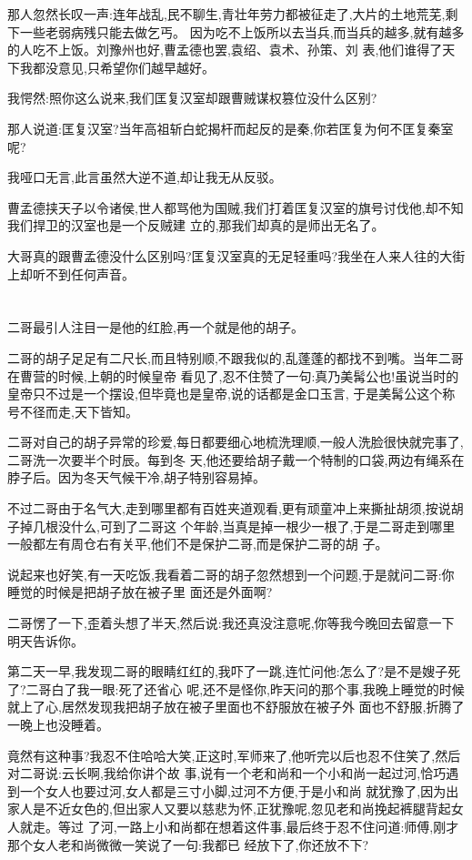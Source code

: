 ﻿\documentclass[12pt,twocolumn]{article}
\begin{document}
那人忽然长叹一声:连年战乱,民不聊生,青壮年劳力都被征走了,大片的土地荒芜,剩下一些老弱病残只能去做乞丐。
因为吃不上饭所以去当兵,而当兵的越多,就有越多的人吃不上饭。刘豫州也好,曹孟德也罢,袁绍、袁术、孙策、刘
表,他们谁得了天下我都没意见,只希望你们越早越好。

我愕然:照你这么说来,我们匡复汉室却跟曹贼谋权篡位没什么区别?

那人说道:匡复汉室?当年高祖斩白蛇揭杆而起反的是秦,你若匡复为何不匡复秦室呢?

我哑口无言,此言虽然大逆不道,却让我无从反驳。

曹孟德挟天子以令诸侯,世人都骂他为国贼,我们打着匡复汉室的旗号讨伐他,却不知我们捍卫的汉室也是一个反贼建
立的,那我们却真的是师出无名了。

大哥真的跟曹孟德没什么区别吗?匡复汉室真的无足轻重吗?我坐在人来人往的大街上却听不到任何声音。

\section{}

二哥最引人注目一是他的红脸,再一个就是他的胡子。

二哥的胡子足足有二尺长,而且特别顺,不跟我似的,乱蓬蓬的都找不到嘴。当年二哥在曹营的时候,上朝的时候皇帝
看见了,忍不住赞了一句:真乃美髯公也!虽说当时的皇帝只不过是一个摆设,但毕竟也是皇帝,说的话都是金口玉言,
于是美髯公这个称号不径而走,天下皆知。

二哥对自己的胡子异常的珍爱,每日都要细心地梳洗理顺,一般人洗脸很快就完事了,二哥洗一次要半个时辰。每到冬
天,他还要给胡子戴一个特制的口袋,两边有绳系在脖子后。因为冬天气候干冷,胡子特别容易掉。

不过二哥由于名气大,走到哪里都有百姓夹道观看,更有顽童冲上来撕扯胡须,按说胡子掉几根没什么,可到了二哥这
个年龄,当真是掉一根少一根了,于是二哥走到哪里一般都左有周仓右有关平,他们不是保护二哥,而是保护二哥的胡
子。

说起来也好笑,有一天吃饭,我看着二哥的胡子忽然想到一个问题,于是就问二哥:你睡觉的时候是把胡子放在被子里
面还是外面啊?

二哥愣了一下,歪着头想了半天,然后说:我还真没注意呢,你等我今晚回去留意一下明天告诉你。

第二天一早,我发现二哥的眼睛红红的,我吓了一跳,连忙问他:怎么了?是不是嫂子死了?二哥白了我一眼:死了还省心
呢,还不是怪你,昨天问的那个事,我晚上睡觉的时候就上了心,居然发现我把胡子放在被子里面也不舒服放在被子外
面也不舒服,折腾了一晚上也没睡着。

竟然有这种事?我忍不住哈哈大笑,正这时,军师来了,他听完以后也忍不住笑了,然后对二哥说:云长啊,我给你讲个故
事,说有一个老和尚和一个小和尚一起过河,恰巧遇到一个女人也要过河,女人都是三寸小脚,过河不方便,于是小和尚
就犹豫了,因为出家人是不近女色的,但出家人又要以慈悲为怀,正犹豫呢,忽见老和尚挽起裤腿背起女人就走。等过
了河,一路上小和尚都在想着这件事,最后终于忍不住问道:师傅,刚才那个女人\dldots 老和尚微微一笑说了一句:我都已
经放下了,你还放不下?
\end{document}
